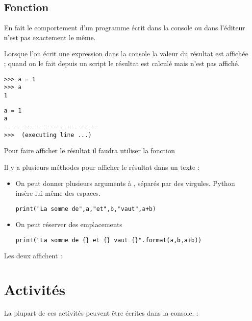 \subsection{Fonction }
En fait le comportement d'un programme écrit dans la console ou dans l'éditeur n'est pas exactement le même.

Lorsque l'on écrit une expression dans la console la valeur du résultat est affichée ; quand on le fait depuis un script le résultat est calculé mais n'est pas affiché.

\begin{lstlisting}
>>> a = 1
>>> a
1
\end{lstlisting}

\begin{lstlisting}
a = 1
a
---------------------------
>>>  (executing line ...)
\end{lstlisting}

Pour faire afficher le résultat il faudra utiliser la fonction  

Il y a plusieurs méthodes pour afficher le résultat dans un texte :

\begin{itemize}
\item On peut donner plusieurs arguments à , séparés par des virgules. Python insère lui-même des espaces.
\begin{lstlisting}
print("La somme de",a,"et",b,"vaut",a+b)
\end{lstlisting}

\item On peut réserver des emplacements 

\begin{lstlisting}
print("La somme de {} et {} vaut {}".format(a,b,a+b))
\end{lstlisting}
\end{itemize}

Les deux affichent : 
\section{Activités}
La plupart de ces activités peuvent être écrites dans la console.
:  %
